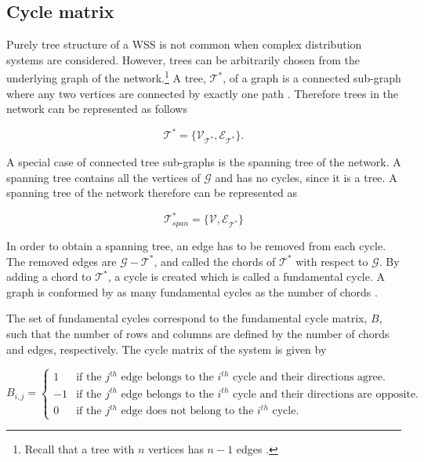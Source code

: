 \subsection{Cycle matrix}
\label{cycle_matrix}

Purely tree structure of a WSS is not common when complex distribution systems are considered. However, trees can be arbitrarily chosen from the underlying graph of the network.\footnote{Recall that a tree with $n$ vertices has $n-1$ edges \cite{deo2017graph}.}  A tree, $\mathcal{T}^* $, of a graph is a connected sub-graph where any two vertices are connected by exactly one path \cite{deo2017graph}. Therefore trees in the network can be represented as follows

\begin{equation}
  \label{Numberofchords}
  \mathcal{T}^* = \{\mathcal{V_{\mathcal{T}^*}}, \mathcal{E_{\mathcal{T}^*}} \}. 
\end{equation}

A special case of connected tree sub-graphs is the spanning tree of the network. A spanning tree contains all the vertices of $\mathcal{G}$ and has no cycles, since it is a tree. A spanning tree of the network therefore can be represented as

\begin{equation}
  \label{Numberofchords}
  \mathcal{T}^*_{span} = \{\mathcal{V}, \mathcal{E_{\mathcal{T}^*}} \} 
\end{equation}

In order to obtain a spanning tree, an edge has to be removed from each cycle. The removed edges are $\mathcal{G} - \mathcal{T}^*$, and called the chords of $\mathcal{T}^*$ with respect to $\mathcal{G}$. By adding a chord to $\mathcal{T}^*$, a cycle is created which is called a fundamental cycle. A graph is conformed by as many fundamental cycles as the number of chords \cite{deo2017graph}.

The set of fundamental cycles correspond to the fundamental cycle matrix, $B$, such that the number of rows and columns are defined by the number of chords and edges, respectively. The cycle matrix of the system is given by

\begin{equation}
\label{DiGraphCycle}
 B_{i,j} =
		\left\{
		\begin{array}{ll}
		
		1 			&     \text{if the $j^{th}$ edge belongs to the $i^{th}$ cycle and their directions agree.}	
\\
		-1          &     \text{if the $j^{th}$ edge belongs to the $i^{th}$ cycle and their directions are opposite.}
\\
        0           &     \text{if the $j^{th}$ edge does not belong to the $i^{th}$ cycle.}
		\end{array}
		\right.
\end{equation}	

